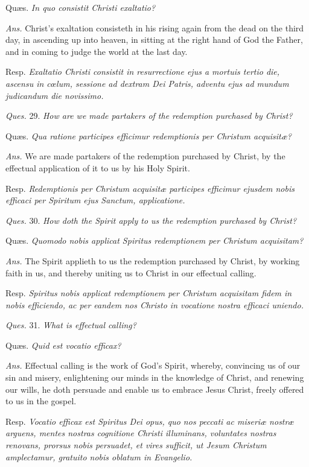 Quæs. \emph{In quo consistit Christi exaltatio?}

\emph{Ans.} Christ's exaltation consisteth in his rising again from the dead on the third day, in ascending up into heaven, in sitting at the right hand of God the Father, and in coming to judge the world at the last day.

Resp. \emph{Exaltatio Christi consistit in resurrectione ejus a mortuis tertio die, ascensu in cœlum, sessione ad dextram Dei Patris, adventu ejus ad mundum judicandum die novissimo.}

\emph{Ques.} 29. \emph{How are we made partakers of the redemption purchased by Christ?}

Quæs. \emph{Qua ratione participes efficimur redemptionis per Christum acquisitæ?}

\emph{Ans.} We are made partakers of the redemption purchased by Christ, by the effectual application of it to us by his Holy Spirit.

Resp. \emph{Redemptionis per Christum acquisitæ participes efficimur ejusdem nobis efficaci per Spiritum ejus Sanctum, applicatione.}

\emph{Ques.} 30. \emph{How doth the Spirit apply to us the redemption purchased by Christ?}

Quæs. \emph{Quomodo nobis applicat Spiritus redemptionem per Christum acquisitam?}

\emph{Ans.} The Spirit applieth to us the redemption purchased by Christ, by working faith in us, and thereby uniting us to Christ in our effectual calling.

Resp. \emph{Spiritus nobis applicat redemptionem per Christum acquisitam fidem in nobis efficiendo, ac per eandem nos Christo in vocatione nostra efficaci uniendo.}

\emph{Ques.} 31. \emph{What is effectual calling?}

Quæs. \emph{Quid est vocatio efficax?}

\emph{Ans.} Effectual calling is the work of God's Spirit, whereby, convincing us of our sin and misery, enlightening our minds in the knowledge of Christ, and renewing our wills, he doth persuade and enable us to embrace Jesus Christ, freely offered to us in the gospel.

Resp. \emph{Vocatio efficax est Spiritus Dei opus, quo nos peccati ac miseriæ nostræ arguens, mentes nostras cognitione Christi illuminans, voluntates nostras renovans, prorsus nobis persuadet, et vires sufficit, ut Jesum Christum amplectamur, gratuito nobis oblatum in Evangelio.}

